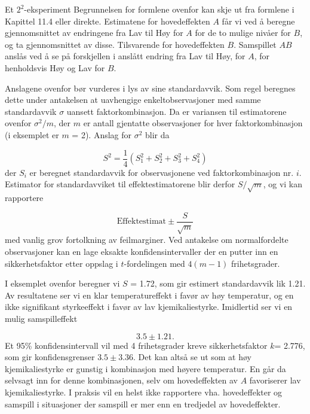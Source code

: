 \begin{eksempel}{Et $2^2$-eksperiment}
Begrunnelsen for formlene ovenfor kan skje ut fra formlene i 
Kapittel 11.4 eller direkte.  Estimatene for hovedeffekten $A$ får
vi ved å beregne gjennomsnittet av endringene fra Lav til Høy 
for $A$ for de to mulige nivåer for $B$, og ta gjennomsnittet av disse.
Tilsvarende for hovedeffekten $B$.  Samspillet $AB$ anslås ved å
se på forskjellen i anslått endring fra Lav til Høy, for $A$,
for henholdsvis Høy og Lav for $B$.

Anslagene ovenfor bør vurderes i lys av sine standardavvik.  Som
regel beregnes dette under antakelsen at uavhengige enkeltobservasjoner
med samme standardavvik $\sigma$ uansett faktorkombinasjon.  Da er 
variansen til estimatorene ovenfor ${\sigma}^2/m$, der $m$ er antall
gjentatte observasjoner for hver faktorkombinasjon (i eksemplet er
$m$ = 2).  Anslag for ${\sigma}^2$ blir da

\[       S^2=\frac{1}{4}(S_1^2+S_2^2+S_3^2+S_4^2) \]
der $S_i$ er beregnet standardavvik for observasjonene ved 
faktorkombinasjon  nr. $i$.
Estimator for standardavviket til effektestimatorene blir derfor
$S/\sqrt{m}$, og vi kan rapportere

\[    \mbox{Effektestimat} \pm \frac{S}{\sqrt{m}}       \]
med vanlig grov fortolkning av feilmarginer.  Ved antakelse om 
normalfordelte observasjoner kan en lage eksakte konfidensintervaller
der en putter inn en sikkerhetsfaktor etter oppslag i $t$-fordelingen
med $4(m-1)$ frihetsgrader.

I eksemplet ovenfor beregner vi $S$ = 1.72, som gir estimert
standardavvik lik 1.21.  Av resultatene ser vi en klar temperatureffekt
i favør av høy temperatur, og en ikke signifikant styrkeeffekt
i favør av lav kjemikaliestyrke.  Imidlertid ser vi en mulig
samspilleffekt

\[         3.5 \pm 1.21 .        \]
Et 95\% konfidensintervall vil med 4 frihetsgrader kreve 
sikkerhetsfaktor $k$= 2.776, som gir konfidensgrenser $3.5 \pm 3.36$.
Det kan altså se ut som at høy kjemikaliestyrke er gunstig
i kombinasjon med høyere temperatur.  En går da selvsagt inn for denne
 kombinasjonen, selv om hovedeffekten av $A$ favoriserer lav kjemikaliestyrke.
I praksis vil en helst ikke rapportere vha. hovedeffekter og samspill i 
situasjoner der samspill er mer enn en tredjedel av hovedeffekter.\\
\end{eksempel}

